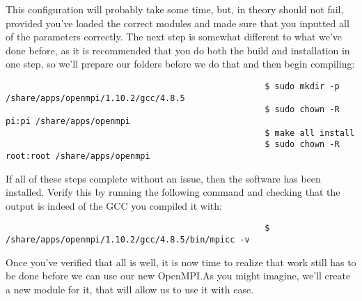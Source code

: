 \documentclass[]{article}
\begin{document}
                                                    This configuration will probably take some time, but, in theory should not fail, provided you've loaded the correct modules and made
                                                    sure that you inputted all of the parameters correctly. The next step is somewhat different to what we've done before, as it is
                                                    recommended that you do both the build and installation in one step, so we'll prepare our folders before we do that and then begin
                                                    compiling:
                                                    \begin{lstlisting}
                                                    $ sudo mkdir -p /share/apps/openmpi/1.10.2/gcc/4.8.5
                                                    $ sudo chown -R pi:pi /share/apps/openmpi
                                                    $ make all install
                                                    $ sudo chown -R root:root /share/apps/openmpi
                                                    \end{lstlisting}
                                                    If all of these steps complete without an issue, then the software has been installed. Verify this by running the following command and
                                                    checking that the output is indeed of the GCC you compiled it with:
                                                    \begin{lstlisting}
                                                    $ /share/apps/openmpi/1.10.2/gcc/4.8.5/bin/mpicc -v
                                                    \end{lstlisting}
                                                    Once you've verified that all is well, it is now time to realize that work still has to be done before we can use our new OpenMPI.As you
                                                    might imagine, we'll create a new module for it, that will allow us to use it with ease.
\end{document}
